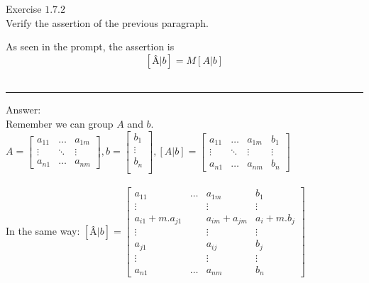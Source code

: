 \documentclass[12pt]{article}
\begin{document}
Exercise $1.7.2$\\

Verify the assertion of the previous paragraph.

As seen in the prompt, the assertion is 
$$
[\textit{\^A}|\textit{\^b}] = M[A|\textit{b}]
$$\\
\noindent\rule{\textwidth}{1pt}

Answer:\\

Remember we can group $A$ and $b$.\\
$
A =
\begin{bmatrix}
	a_{11} & \hdots & a_{1m}\\
	\vdots & \ddots & \vdots\\
	a_{n1} & \hdots & a_{nm}
\end{bmatrix}
,b =
\begin{bmatrix}
	b_{1}\\
	\vdots\\
	b_{n}\\
\end{bmatrix}
, [A|b] = 
\begin{bmatrix}
	a_{11} & \hdots & a_{1m} & b_{1}\\
	\vdots & \ddots & \vdots & \vdots\\
	a_{n1} & \hdots & a_{nm} & b_{n}
\end{bmatrix}
$\\
\\

In the same way:
$
[\textit{\^A}|\textit{\^b}] = 
\begin{bmatrix}
	a_{11} & \hdots & a_{1m} & b_{1}\\
	\vdots & & \vdots & \vdots\\
	a_{i1} + m.a_{j1} & & a_{im} + a_{jm} & a_{i} + m.b_{j}\\
	\vdots & & \vdots & \vdots\\
	a_{j1} & & a_{ij} & b_{j}\\
	\vdots & & \vdots &\vdots\\
	a_{n1} & \hdots & a_{nm} & b_{n}
\end{bmatrix}
$\\
\end{document}
